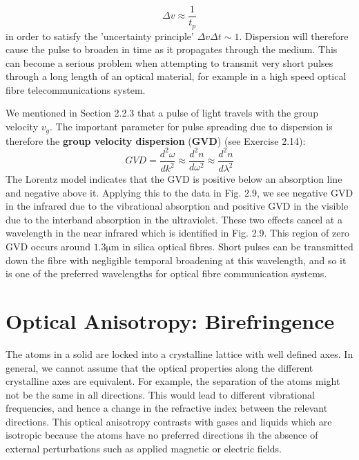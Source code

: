 \documentclass[12pt]{book}
\begin{document}
\begin{equation}\label{equa:2.38}
  \Delta v\approx\frac{1}{t_p}
\end{equation}
in order to satisfy the 'uncertainty principle' $\Delta v\Delta t\sim 1$. Dispersion will therefore cause the pulse to broaden in time as it propagates through the medium. This can become a serious problem when attempting to transmit very short pulses through a long length of an optical material, for example in a high speed optical fibre telecommunications system.

We mentioned in Section 2.2.3 that a pulse of light travels with the group velocity $v_g$. The important parameter for pulse spreading due to dispersion is therefore the \textbf{group velocity dispersion} (\textbf{GVD}) (see Exercise 2.14):
\begin{equation}\label{equa:2.39}
  GVD=\frac{d^2\omega}{dk^2}\approx\frac{d^2n}{d\omega^2}\approx\frac{d^2n}{d\lambda^2}
\end{equation}
The Lorentz model indicates that the GVD is positive below an absorption line and negative above it. Applying this to the data in Fig. 2.9, we see negative GVD in the infrared due to the vibrational absorption and positive GVD in the visible due to the interband absorption in the ultraviolet. These two effects cancel at a wavelength in the near infrared which is identified in Fig. 2.9. This region of zero GVD occurs around $\mathrm{1.3\mu m}$ in silica optical fibres. Short pulses can be transmitted down the fibre with negligible temporal broadening at this wavelength, and so it is one of the preferred wavelengths for optical fibre communication systems.

\section{Optical Anisotropy: Birefringence}

The atoms in a solid are locked into a crystalline lattice with well defined axes. In general, we cannot assume that the optical properties along the different crystalline axes are equivalent. For example, the separation of the atoms might not be the same in all directions. This would lead to different vibrational frequencies, and hence a change in the refractive index between the relevant directions. This optical anisotropy contrasts with gases and liquids which are isotropic because the atoms have no preferred directions ih the absence of external perturbations such as applied magnetic or electric fields.
\end{document}
